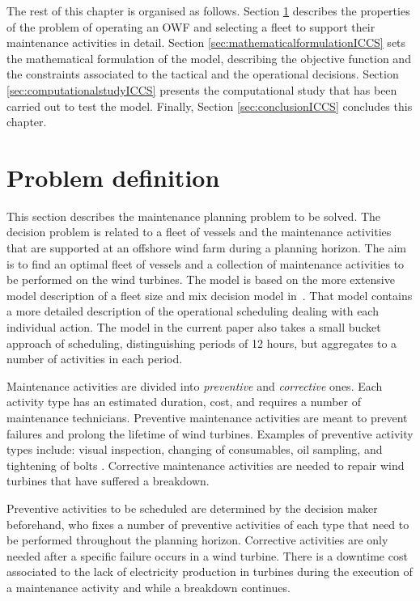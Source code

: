 The rest of this chapter is organised as follows. Section \ref{sec:problemdescriptionICCS} describes  the properties of the problem of operating an OWF and selecting a fleet to support their maintenance activities in detail. Section \ref{sec:mathematicalformulationICCS} sets the mathematical formulation of the model, describing the objective function and the constraints associated to the tactical and the operational decisions. Section \ref{sec:computationalstudyICCS} presents the computational study that has been carried out to test the model. Finally, Section \ref{sec:conclusionICCS} concludes this chapter.


\section{Problem definition}
\label{sec:problemdescriptionICCS}

This section describes the maintenance planning problem to be solved. The decision problem is related to a fleet of vessels and the maintenance activities that are supported at an offshore wind farm during a planning horizon. The aim is to find an optimal fleet of vessels and a collection of maintenance activities to be performed on the wind turbines. The model is based on the more extensive model description of a fleet size and mix decision model in~\cite{Elin}. That model contains a more detailed description of the operational scheduling dealing with each individual action. The model in the current paper also takes a small bucket approach of scheduling, distinguishing periods of 12 hours, but aggregates to a number of activities in each period.

Maintenance activities are divided into \emph{preventive} and \emph{corrective} ones. Each activity type has an estimated duration, cost, and requires a number of maintenance technicians. Preventive maintenance activities are meant to prevent failures and prolong the lifetime of wind turbines. Examples of preventive activity types include: visual inspection, changing of consumables, oil sampling, and tightening of bolts \cite{obdam}. Corrective maintenance activities are needed to repair wind turbines that have suffered a breakdown.

Preventive activities to be scheduled are determined by the decision maker beforehand, who fixes a number of preventive activities of each type that need to be performed throughout the planning horizon. Corrective activities are only needed after a specific failure occurs in a wind turbine. There is a downtime cost associated to the lack of electricity production in turbines during the execution of a maintenance activity and while a breakdown continues. %


